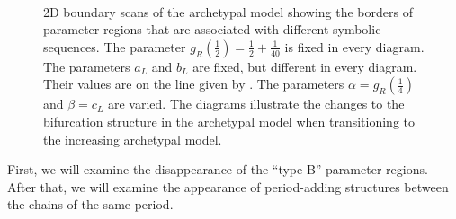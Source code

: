 \begin{figure}
	\centering
	 \\
	\caption[Changes to the bifurcation structures of the archetypal model during its transition to the increasing archetypal model]{
		2D boundary scans of the archetypal model showing the borders of parameter regions that are associated with different symbolic sequences.
		The parameter $g_R\left(\frac{1}{2}\right) = \frac{1}{2} + \frac{1}{40}$ is fixed in every diagram.
		The parameters $a_L$ and $b_L$ are fixed, but different in every diagram.
		Their values are on the line given by .
		The parameters $\alpha = g_R\left(\frac{1}{4}\right)$ and $\beta = c_L$ are varied.
		The diagrams illustrate the changes to the bifurcation structure in the archetypal model when transitioning to the increasing archetypal model.
	}
	\label{fig:add.change.regions}
\end{figure}

First, we will examine the disappearance of the ``type B'' parameter regions.
After that, we will examine the appearance of period-adding structures between the chains of the same period.



